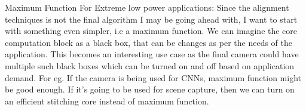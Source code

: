 Maximum Function For Extreme low power applications:
Since the alignment techniques is not the final algorithm I may be going ahead with, I want to start with something even simpler, i.e a maximum function. We can imagine the core computation block as a black box, that can be changes as per the needs of the application. This becomes an interesting use case as the final camera could have multiple such black boxes which can be turned on and off based on application demand. For eg. If the camera is being used for CNNs, maximum function might be good enough. If it's going to be used for scene capture, then we can turn on an efficient stitching core instead of maximum function.





